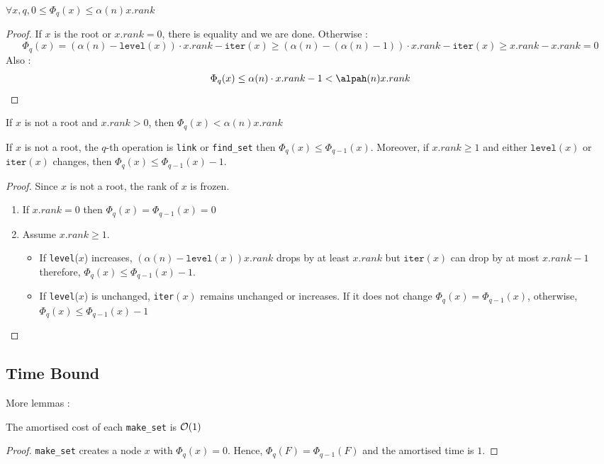 \documentclass{cours}
\begin{document}
\begin{lemma}
    $\forall x, q, 0 \leq \Phi_{q}(x) \leq \alpha(n)x.rank$
\end{lemma}
\begin{proof}
    If $x$ is the root or $x.rank = 0$, there is equality and we are done. Otherwise : 
    \[
        \Phi_{q}(x) = \left(\alpha(n) - \texttt{level}(x)\right) \cdot x.rank - \texttt{iter}(x) \geq \left(\alpha(n) - (\alpha(n) - 1)\right) \cdot x.rank - \texttt{iter}(x) \geq x.rank - x.rank = 0
    \]
    Also : 
    \[
        \Phi_{q}(x) \leq \alpha(n)\cdot x.rank - 1 < \alpah(n) x.rank
    \]
\end{proof}
\begin{corollary}\label{cor9}
    If $x$ is not a root and $x.rank > 0$, then $\Phi_{q}(x) < \alpha(n)x.rank$
\end{corollary}

\begin{lemma}\label{lemma10}
    If $x$ is not a root, the $q$-th operation is \texttt{link} or \texttt{find_set} then $\Phi_{q}(x) \leq \Phi_{q - 1}(x)$. Moreover, if $x.rank \geq 1$ and either $\texttt{level}(x)$ or $\texttt{iter}(x)$ changes, then $\Phi_{q}(x) \leq \Phi_{q - 1}(x) - 1$.
\end{lemma}
\begin{proof}
    Since $x$ is not a root, the rank of $x$ is frozen.
    \begin{enumerate}
        \item If $x.rank = 0$ then $\Phi_{q}(x) = \Phi_{q - 1}(x) = 0$
        \item Assume $x.rank \geq 1$.
        \begin{itemize}
            \item If \texttt{level}($x$) increases, $\left(\alpha(n) - \texttt{level}(x)\right)x.rank$ drops by at least $x.rank$ but $\texttt{iter}(x)$ can drop by at most $x.rank - 1$ therefore, $\Phi_{q}(x) \leq \Phi_{q - 1}(x) - 1$.
            \item If \texttt{level}($x$) is unchanged, \texttt{iter}$(x)$ remains unchanged or increases. If it does not change $\Phi_{q}(x) = \Phi_{q - 1}(x)$, otherwise, $\Phi_{q}(x) \leq \Phi_{q - 1}(x) - 1$
        \end{itemize}
    \end{enumerate}
\end{proof}

\subsection{Time Bound}
More lemmas : 
\begin{lemma}
    The amortised cost of each \texttt{make_set} is $\mathcal{O}(1)$
\end{lemma}
\begin{proof}
    \texttt{make_set} creates a node $x$ with $\Phi_{q}(x) = 0$. Hence, $\Phi_{q}(F) = \Phi_{q - 1}(F)$ and the amortised time is $1$.
\end{proof}
\end{document}
